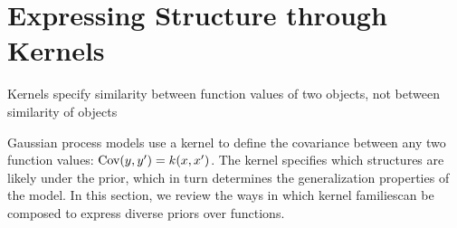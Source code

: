 
\inbpdocument

\chapter{Expressing Structure through Kernels}
\label{ch:kernels}





Kernels specify similarity between function values of two objects, not between similarity of objects



Gaussian process models use a kernel to define the covariance between any two function values: ${\textrm{Cov}(y, y') = k(x,x')}$.
The kernel specifies which structures are likely under the \gp{} prior, which in turn determines the generalization properties of the model.
%
%
In this section, we review the ways in which kernel families\footnotemark can be composed to express diverse priors over functions. 

